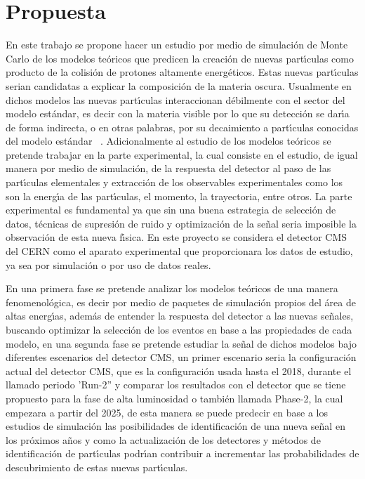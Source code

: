 \chapter{Propuesta}

En este trabajo se propone hacer un estudio por medio de simulaci\'on de Monte Carlo de los modelos te\'oricos que predicen la creaci\'on de nuevas part\'{\i}culas como producto de la colisi\'on de protones altamente energ\'eticos. Estas nuevas part\'{\i}culas serian candidatas a explicar la composici\'on de la materia oscura.  Usualmente en dichos modelos las nuevas part\'{\i}culas interaccionan d\'ebilmente con el sector del modelo est\'andar, es decir con la materia visible por lo que su detecci\'on se dar\'{\i}a de forma indirecta, o en otras palabras, por su decaimiento a part\'{\i}culas conocidas del modelo est\'andar~\cite{Curtin2015} .  Adicionalmente al estudio de los modelos te\'oricos se pretende trabajar en la parte experimental, la cual consiste en el estudio, de igual manera por medio de simulaci\'on, de la respuesta del detector al paso de las part\'{\i}culas elementales y extracci\'on de los observables experimentales como los son la energ\'{\i}a de las part\'{\i}culas, el momento, la trayectoria, entre otros.  La parte experimental es fundamental ya que sin una buena estrategia de selecci\'on de datos, t\'ecnicas de supresi\'on de ruido y optimizaci\'on de la se\~nal seria imposible la observaci\'on de esta nueva f\'{\i}sica. En este proyecto se considera el detector CMS del CERN como el aparato experimental que proporcionara los datos de estudio, ya sea por simulaci\'on o por uso de datos reales.  

En una primera fase se pretende analizar los modelos te\'oricos de una manera fenomenol\'ogica, es decir por medio de paquetes de simulaci\'on propios del \'area de altas energ\'{\i}as, adem\'as de entender la respuesta del detector a las nuevas se\~nales, buscando optimizar la selecci\'on de los eventos en base a las propiedades de cada modelo, en una segunda fase se pretende estudiar la se\~nal de dichos modelos bajo diferentes escenarios del detector CMS, un primer escenario seria la configuraci\'on actual del detector CMS, que es la configuraci\'on usada hasta el 2018, durante el llamado periodo 'Run-2'' y comparar los resultados con el detector que se tiene propuesto para la fase de alta luminosidad o tambi\'en llamada Phase-2, la cual empezara  a partir del 2025, de esta manera se puede predecir en base a los estudios de simulaci\'on las posibilidades de identificaci\'on de una nueva se\~nal en los pr\'oximos a\~nos y como la actualizaci\'on de los detectores y m\'etodos de identificaci\'on de part\'{\i}culas podr\'{\i}an contribuir a incrementar las probabilidades de descubrimiento de estas nuevas part\'{\i}culas. 


